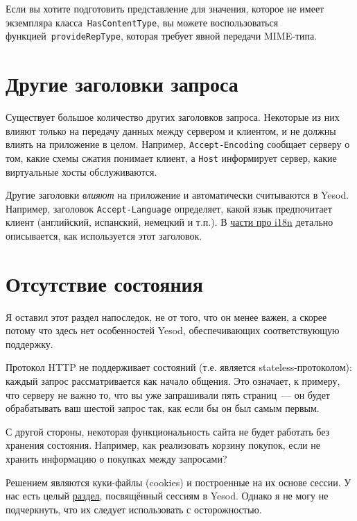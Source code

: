 \begin{remark}
    Если вы хотите подготовить представление для значения, которое не имеет
    экземпляра класса~\lstinline'HasContentType', вы можете воспользоваться
    функцией~\lstinline'provideRepType', которая требует явной передачи
    MIME-типа.
\end{remark}

\section{Другие заголовки запроса}

Существует большое количество других заголовков запроса. Некоторые из них
влияют только на передачу данных между сервером и клиентом, и не должны влиять
на приложение в целом.  Например, \texttt{Accept-Encoding} сообщает серверу о
том, какие схемы сжатия понимает клиент, а \texttt{Host} информирует сервер,
какие виртуальные хосты обслуживаются.

Другие заголовки \emph{влияют} на приложение и автоматически считываются в Yesod.
Например, заголовок \texttt{Accept-Language} определяет, какой язык предпочитает
клиент (английский, испанский, немецкий и т.п.). В \hyperref[chap:i18n]{части
    про i18n} детально описывается, как используется этот заголовок.

\section{Отсутствие состояния}

Я оставил этот раздел напоследок, не от того, что он менее важен, а скорее
потому что здесь нет особенностей Yesod, обеспечивающих соответствующую
поддержку.

Протокол HTTP не поддерживает состояний (т.е. является stateless-протоколом):
каждый запрос рассматривается как начало общения. Это означает, к примеру, что
серверу не важно то, что вы уже запрашивали пять страниц~--- он будет
обрабатывать ваш шестой запрос так, как если бы он был самым первым.

С другой стороны, некоторая функциональность сайта не будет работать без
хранения состояния. Например, как реализовать корзину покупок, если не хранить
информацию о покупках между запросами?

Решением являются куки-файлы (cookies) и построенные на их основе сессии. У нас
есть целый \hyperref[chap:sessions]{раздел}, посвящённый сессиям в Yesod.
Однако я не могу не подчеркнуть, что их следует использовать с осторожностью.

